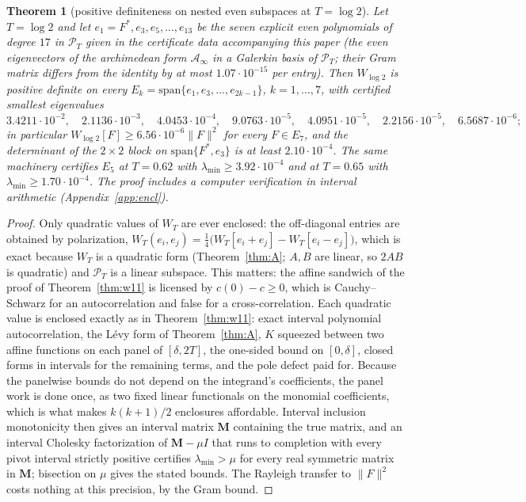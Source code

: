 \documentclass[11pt]{amsart}
\newtheorem{theorem}{Theorem}[section]
\theoremstyle{definition}
\theoremstyle{remark}
\newcommand{\PT}{\mathcal P_T}
\newcommand{\Ainf}{\mathcal A_\infty}
\begin{document}
\begin{theorem}[positive definiteness on nested even subspaces at $T=\log2$]\label{thm:nest}
Let $T=\log2$ and let $e_1=F^*,e_3,e_5,\dots,e_{13}$ be the seven explicit even polynomials of degree $17$
in $\PT$ given in the certificate data accompanying this paper (the even eigenvectors of the archimedean
form $\Ainf$ in a Galerkin basis of $\PT$; their Gram matrix differs from the identity by at most
$1.07\cdot10^{-15}$ per entry). Then $W_{\log2}$ is positive definite on
every $E_k=\mathrm{span}\{e_1,e_3,\dots,e_{2k-1}\}$, $k=1,\dots,7$, with certified smallest
eigenvalues
\[
3.4211\cdot10^{-2},\quad2.1136\cdot10^{-3},\quad4.0453\cdot10^{-4},\quad9.0763\cdot10^{-5},\quad
4.0951\cdot10^{-5},\quad2.2156\cdot10^{-5},\quad6.5687\cdot10^{-6};
\]
in particular $W_{\log2}[F]\ge6.56\cdot10^{-6}\|F\|^2$ for every $F\in E_7$, and the determinant of
the $2\times2$ block on $\mathrm{span}\{F^*,e_3\}$ is at least $2.10\cdot10^{-4}$. The same machinery
certifies $E_5$ at $T=0.62$ with $\lambda_{\min}\ge3.92\cdot10^{-4}$ and at $T=0.65$ with
$\lambda_{\min}\ge1.70\cdot10^{-4}$.
The proof includes a computer verification in interval arithmetic (Appendix~\ref{app:encl}).
\end{theorem}
\begin{proof}
Only quadratic values of $W_T$ are ever enclosed: the off-diagonal entries are obtained by
polarization, $W_T(e_i,e_j)=\frac14\big(W_T[e_i+e_j]-W_T[e_i-e_j]\big)$, which is exact because $W_T$
is a quadratic form (Theorem~\ref{thm:A}; $A,B$ are linear, so $2AB$ is quadratic) and $\PT$ is a
linear subspace. This matters: the affine sandwich of the proof of Theorem~\ref{thm:w11} is licensed
by $c(0)-c\ge0$, which is Cauchy--Schwarz for an autocorrelation and false for a cross-correlation.
Each quadratic value is enclosed exactly as in Theorem~\ref{thm:w11}: exact interval polynomial
autocorrelation, the L\'evy form of Theorem~\ref{thm:A}, $K$ squeezed between two affine functions on
each panel of $[\delta,2T]$, the one-sided bound on $[0,\delta]$, closed forms in intervals for the
remaining terms, and the pole defect paid for. Because the panelwise bounds do not depend on the
integrand's coefficients, the panel work is done once, as two fixed linear functionals on the
monomial coefficients, which is what makes $k(k+1)/2$ enclosures affordable. Interval inclusion
monotonicity then gives an interval matrix $\boldsymbol M$ containing the true matrix, and an interval
Cholesky factorization of $\boldsymbol M-\mu I$ that runs to completion with every pivot interval
strictly positive certifies $\lambda_{\min}>\mu$ for every real symmetric matrix in
$\boldsymbol M$; bisection on $\mu$ gives the stated bounds. The Rayleigh transfer to $\|F\|^2$ costs
nothing at this precision, by the Gram bound.
\end{proof}
\end{document}
